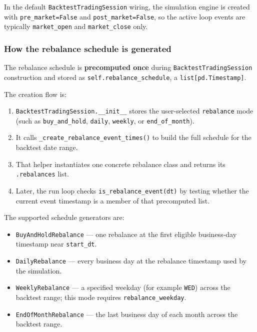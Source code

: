 \documentclass[11pt]{article}
\begin{document}
In the default \texttt{BacktestTradingSession} wiring, the simulation engine is created with \texttt{pre\_market=False} and \texttt{post\_market=False}, so the active loop events are typically \texttt{market\_open} and \texttt{market\_close} only.

\subsubsection{How the rebalance schedule is generated}

The rebalance schedule is \textbf{precomputed once} during \texttt{BacktestTradingSession} construction and stored as \texttt{self.rebalance\_schedule}, a \texttt{list[pd.Timestamp]}.

The creation flow is:

\begin{enumerate}[leftmargin=*]
  \item \texttt{BacktestTradingSession.\_\_init\_\_} stores the user-selected \texttt{rebalance} mode (such as \texttt{buy\_and\_hold}, \texttt{daily}, \texttt{weekly}, or \texttt{end\_of\_month}).
  \item It calls \texttt{\_create\_rebalance\_event\_times()} to build the full schedule for the backtest date range.
  \item That helper instantiates one concrete rebalance class and returns its \texttt{.rebalances} list.
  \item Later, the run loop checks \texttt{is\_rebalance\_event(dt)} by testing whether the current event timestamp is a member of that precomputed list.
\end{enumerate}

The supported schedule generators are:

\begin{itemize}[leftmargin=*]
  \item \texttt{BuyAndHoldRebalance} --- one rebalance at the first eligible business-day timestamp near \texttt{start\_dt}.
  \item \texttt{DailyRebalance} --- every business day at the rebalance timestamp used by the simulation.
  \item \texttt{WeeklyRebalance} --- a specified weekday (for example \texttt{WED}) across the backtest range; this mode requires \texttt{rebalance\_weekday}.
  \item \texttt{EndOfMonthRebalance} --- the last business day of each month across the backtest range.
\end{itemize}
\end{document}
